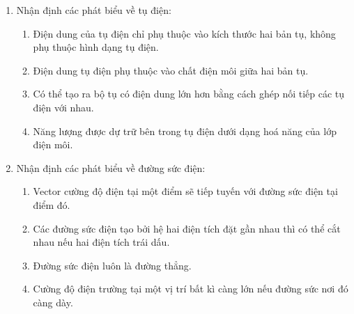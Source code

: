 \begin{enumerate}[label=\bfseries Câu \arabic*:]
\item Nhận định các phát biểu về tụ điện:
\begin{enumerate}[label=\bfseries \alph*)]
	\item Điện dung của tụ điện chỉ phụ thuộc vào kích thước hai bản tụ, không phụ thuộc hình dạng tụ điện.
	\item Điện dung tụ điện phụ thuộc vào chất điện môi giữa hai bản tụ.
	\item Có thể tạo ra bộ tụ có điện dung lớn hơn bằng cách ghép nối tiếp các tụ điện với nhau.
	\item Năng lượng được dự trữ bên trong tụ điện dưới dạng hoá năng của lớp điện môi.
\end{enumerate}

\item Nhận định các phát biểu về đường sức điện:
\begin{enumerate}[label=\bfseries \alph*)]
	\item Vector cường độ điện tại một điểm sẽ tiếp tuyến với đường sức điện tại điểm đó.
	\item Các đường sức điện tạo bởi hệ hai điện tích đặt gần nhau thì có thể cắt nhau nếu hai điện tích trái dấu.
	\item Đường sức điện luôn là đường thẳng.
	\item Cường độ điện trường tại một vị trí bất kì càng lớn nếu đường sức nơi đó càng dày.
\end{enumerate}


\end{enumerate}
